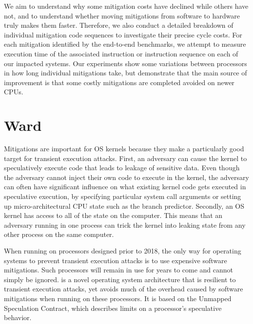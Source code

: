 We aim to understand why some mitigation costs have declined while others have not, and to understand whether moving mitigations from software to hardware truly makes them faster.
Therefore, we also conduct a detailed breakdown of individual mitigation code sequences to investigate their precise cycle costs.
For each mitigation identified by the end-to-end benchmarks, we attempt to measure execution time of the associated instruction or instruction sequence on each of our impacted systems.
Our experiments show some variations between processors in how long individual mitigations take, but demonstrate that the main source of improvement is that some costly mitigations are completed avoided on newer CPUs. 

\section{Ward}
Mitigations are important for OS kernels because they make a particularly good target for transient execution attacks.
First, an adversary can cause the kernel to speculatively execute code that
leads to leakage of sensitive data. Even though the adversary cannot
inject their own code to execute in the kernel, the adversary can often
have significant influence on what existing kernel code gets executed in
speculative execution, by specifying particular system call arguments or
setting up micro-architectural CPU state such as the branch predictor.
Secondly, an OS kernel has access to all of the state
on the computer. This means that an adversary running in one process
can trick the kernel into leaking state from any other process on the
same computer.

When running on processors designed prior to 2018, the only way for operating systems to prevent transient execution attacks is to use expensive software mitigations.
Such processors will remain in use for years to come and cannot simply be ignored.
\sys is a novel operating system architecture that is resilient to transient execution attacks, yet avoids much of the overhead caused by software mitigations when running on these processors.
It is based on the Unmapped Speculation Contract, which describes limits on a processor's speculative behavior.

